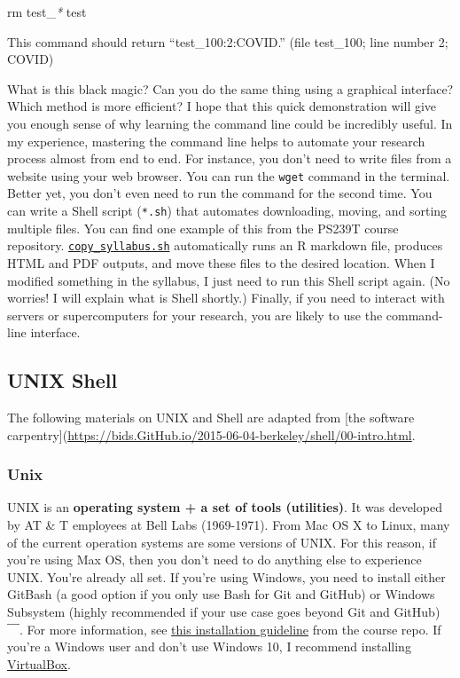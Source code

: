\documentclass[
]{book}
\newenvironment{Shaded}{\begin{snugshade}}{\end{snugshade}}
\newcommand{\FunctionTok}[1]{\textcolor[rgb]{0.00,0.00,0.00}{#1}}
\newcommand{\NormalTok}[1]{#1}
\newcommand{\PreprocessorTok}[1]{\textcolor[rgb]{0.56,0.35,0.01}{\textit{#1}}}
\begin{document}
\begin{Shaded}
\begin{Highlighting}[]

\FunctionTok{rm}\NormalTok{ test\_}\PreprocessorTok{*}\NormalTok{ test }
\end{Highlighting}
\end{Shaded}

This command should return ``test\_100:2:COVID.'' (file test\_100; line number 2; COVID)

What is this black magic? Can you do the same thing using a graphical interface? Which method is more efficient? I hope that this quick demonstration will give you enough sense of why learning the command line could be incredibly useful. In my experience, mastering the command line helps to automate your research process almost from end to end. For instance, you don't need to write files from a website using your web browser. You can run the \texttt{wget} command in the terminal. Better yet, you don't even need to run the command for the second time. You can write a Shell script (\texttt{*.sh}) that automates downloading, moving, and sorting multiple files. You can find one example of this from the PS239T course repository. \href{https://GitHub.com/PS239T/spring_2021/blob/main/copy_syllabus.sh}{\texttt{copy\_syllabus.sh}} automatically runs an R markdown file, produces HTML and PDF outputs, and move these files to the desired location. When I modified something in the syllabus, I just need to run this Shell script again. (No worries! I will explain what is Shell shortly.) Finally, if you need to interact with servers or supercomputers for your research, you are likely to use the command-line interface.

\hypertarget{unix-shell}{%
\subsection{UNIX Shell}\label{unix-shell}}

The following materials on UNIX and Shell are adapted from {[}the software carpentry{]}(\url{https://bids.GitHub.io/2015-06-04-berkeley/shell/00-intro.html}.

\hypertarget{unix}{%
\subsubsection{Unix}\label{unix}}

UNIX is an \textbf{operating system + a set of tools (utilities)}. It was developed by AT \& T employees at Bell Labs (1969-1971). From Mac OS X to Linux, many of the current operation systems are some versions of UNIX. For this reason, if you're using Max OS, then you don't need to do anything else to experience UNIX. You're already all set. If you're using Windows, you need to install either GitBash (a good option if you only use Bash for Git and GitHub) or Windows Subsystem (highly recommended if your use case goes beyond Git and GitHub)￣. For more information, see \href{https://GitHub.com/PS239T/spring_2021/blob/main/B_Install.md}{this installation guideline} from the course repo. If you're a Windows user and don't use Windows 10, I recommend installing \href{https://www.virtualbox.org/}{VirtualBox}.
\end{document}
